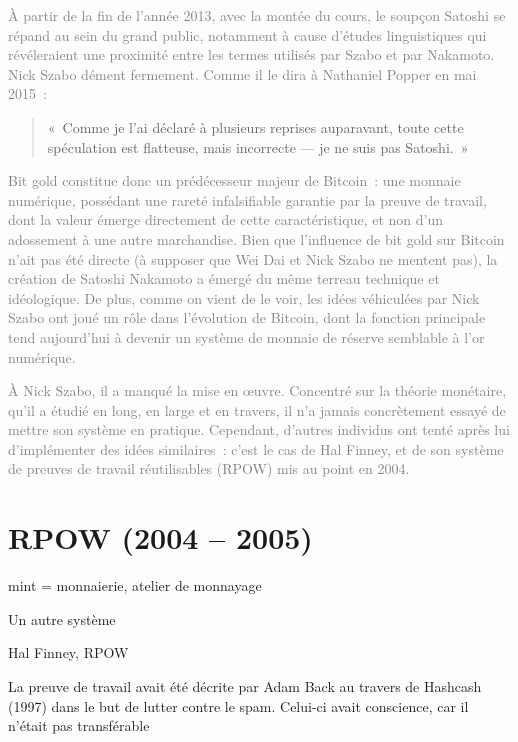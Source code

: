 \textcolor{gray}{À partir de la fin de l'année 2013, avec la montée du cours, le soupçon Satoshi se répand au sein du grand public, notamment à cause d'études linguistiques qui révéleraient une proximité entre les termes utilisés par Szabo et par Nakamoto. Nick Szabo dément fermement. Comme il le dira à Nathaniel Popper en mai 2015~:}

\begin{quote}
«~Comme je l'ai déclaré à plusieurs reprises auparavant, toute cette spéculation est flatteuse, mais incorrecte — je ne suis pas Satoshi.~»
\end{quote}

\textcolor{gray}{Bit gold constitue donc un prédécesseur majeur de Bitcoin~: une monnaie numérique, possédant une rareté infalsifiable garantie par la preuve de travail, dont la valeur émerge directement de cette caractéristique, et non d'un adossement à une autre marchandise. Bien que l'influence de bit gold sur Bitcoin n'ait pas été directe (à supposer que Wei Dai et Nick Szabo ne mentent pas), la création de Satoshi Nakamoto a émergé du même terreau technique et idéologique. De plus, comme on vient de le voir, les idées véhiculées par Nick Szabo ont joué un rôle dans l'évolution de Bitcoin, dont la fonction principale tend aujourd'hui à devenir un système de monnaie de réserve semblable à l'or numérique.}

\textcolor{gray}{À Nick Szabo, il a manqué la mise en œuvre. Concentré sur la théorie monétaire, qu'il a étudié en long, en large et en travers, il n'a jamais concrètement essayé de mettre son système en pratique. Cependant, d'autres individus ont tenté après lui d'implémenter des idées similaires~: c'est le cas de Hal Finney, et de son système de preuves de travail réutilisables (RPOW) mis au point en 2004.}


\section{RPOW (2004 -- 2005)}

mint = monnaierie, atelier de monnayage

Un autre système

Hal Finney, RPOW

La preuve de travail avait été décrite par Adam Back au travers de Hashcash (1997) dans le but de lutter contre le spam.  Celui-ci avait conscience, car il n'était pas transférable

